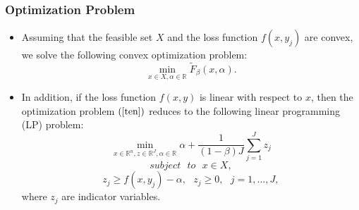 \documentclass[pdf,9pt,xcolor=dvipsnames,hide notes]{beamer}
\begin{document}
\begin{frame}[label=frame2b8]
	\frametitle{Optimization Problem}
	
	\begin{itemize}
		\justifying
		
		\item Assuming that the feasible set $X$ and the loss
		function $f(x,y_{j})$ are convex, we solve the following convex optimization problem:
		\begin{equation}
		\underset{x\in X,\alpha \in
			\mathbb{R}
		}{\min }\widetilde{F}_{\beta }\left( x,\alpha \right) .  \label{ten}
		\end{equation}
		
		\vspace{0.3cm}
		
		\item In addition, if the loss function $f(x,y)$ is linear with respect to
		\thinspace $x$, then the optimization problem $\left( \ref{ten}\right) $
		reduces to the following linear programming (LP) problem:%
		\begin{equation}
		\underset{x\in
			\mathbb{R}
			^{n},z\in
			\mathbb{R}
			^{J},\alpha \in
			\mathbb{R}
		}{\min }\alpha +\frac{1}{\left( 1-\beta \right) J}\sum_{j=1}^{J}z_{j}
		\label{eleven}
		\end{equation}%
		\begin{equation}
		subject\text{ } to\text{ }x\in X,  \label{12}
		\end{equation}
		\begin{equation}
		z_{j}\geq f(x,y_{j})-\alpha ,\text{ }z_{j}\geq 0,\text{ }j=1,...,J,
		\label{13}
		\end{equation}
		where $z_{j}$ are indicator variables. 
		
	\end{itemize}
	
\end{frame}
\end{document}
